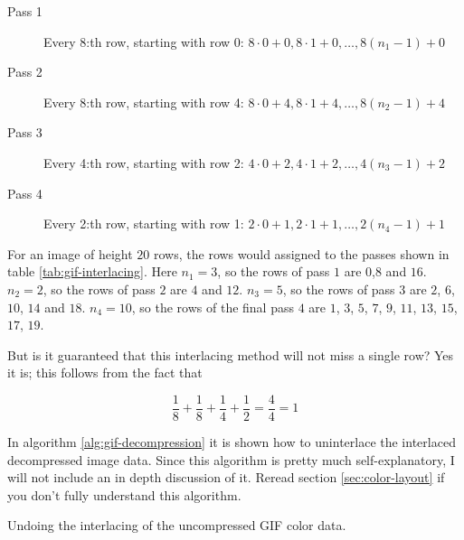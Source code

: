 \newcommand{\passrows}[3]{$#1 \cdot 0 + #2, #1 \cdot 1 + #2, \dots,
  #1(n_{#3}-1) + #2$}

\begin{description}
\item[Pass 1] Every 8:th row, starting with row 0: \passrows{8}{0}{1}
\item[Pass 2] Every 8:th row, starting with row 4: \passrows{8}{4}{2}
\item[Pass 3] Every 4:th row, starting with row 2: \passrows{4}{2}{3}
\item[Pass 4] Every 2:th row, starting with row 1: \passrows{2}{1}{4}
\end{description}

For an image of height $20$ rows, the rows would assigned to the
passes shown in table \ref{tab:gif-interlacing}. Here $n_1 =
3$, so the rows of pass $1$ are $0$,$8$ and $16$. $n_2 = 2$, so the
rows of pass $2$ are $4$ and $12$. $n_3 = 5$, so the rows of pass $3$
are $2$, $6$, $10$, $14$ and $18$. $n_4 = 10$, so the rows of the
final pass $4$ are $1$, $3$, $5$, $7$, $9$, $11$, $13$, $15$, $17$,
$19$.

But is it guaranteed that this interlacing method will not miss a single
row? Yes it is; this follows from the fact that

\begin{equation*}
  \frac{1}{8} + \frac{1}{8} + \frac{1}{4} + \frac{1}{2} = \frac{4}{4}
  = 1
\end{equation*}

In algorithm \ref{alg:gif-decompression} it is shown how to
uninterlace the interlaced decompressed image data.  Since this
algorithm is pretty much self-explanatory, I will not include an in
depth discussion of it. Reread section \ref{sec:color-layout} if you
don't fully understand this algorithm.

\begin{algorithm}[H]
  \caption{Undoing the interlacing of the uncompressed GIF color data.}
  \label{alg:gif-interlace}
  \begin{algorithmic}[1]






    \EndForTo


    \EndWhile

    \EndForTo

  \end{algorithmic}
\end{algorithm}

